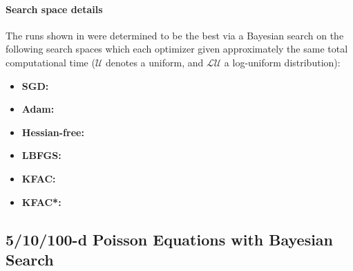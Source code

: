\paragraph{Search space details} The runs shown in  were determined to be the best via a Bayesian search on the following search spaces which each optimizer given approximately the same total computational time ($\mathcal{U}$ denotes a uniform, and $\mathcal{LU}$ a log-uniform distribution):
\begin{itemize}
  \def\pathToRuns{kfac_pinns_exp/exp21_poisson_10d/tex/}
\item \textbf{SGD:} 
\item \textbf{Adam:} 
\item \textbf{Hessian-free:} 
\item \textbf{LBFGS:} 
\item \textbf{KFAC:} 
\item \textbf{KFAC*:} 
\end{itemize}

\subsection{5/10/100-d Poisson Equations with Bayesian Search}\label{sec:high-dimensional-poissons-app}

